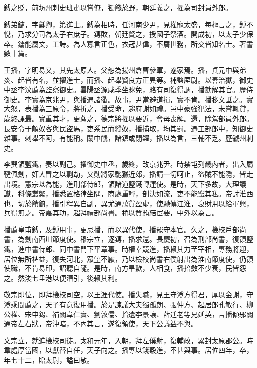 \begin{pinyinscope}
 鎛之貶，前坊州刺史班肅以嘗僚，獨餞於野，朝廷義之，擢為司封員外郎。



 鎛弟鏞，字龢卿，第進士。鎛為相時，任河南少尹，見權寵太盛，每極言之，鎛不悅，乃求分司為太子右庶子。鎛敗，朝廷賢之，授國子祭酒。開成初，以太子少保卒。鏞能屬文，工詩。為人寡言正色，衣冠甚偉，不屑世務，所交皆知名士。著書數十篇。



 王播，字明易又，其先太原人。父恕為揚州倉曹參軍，遂家焉。播，貞元中與弟炎、起皆有名，並擢進士，而播、起舉賢良方正異等。補盩厔尉。以善治獄，御史中丞李汶薦為監察御史。雲陽丞源咸季坐賕免，賂有司復得調，播劾解其官。歷侍御史。李實為京兆尹，與播遇諸衢。故事，尹當避道揖，實不肯。播移文詆之。實大怒，表播為三原令，將折之，播受命，趨府謝如禮。邑中豪強犯法，未嘗輒貸，歲終課最。實重其才，更薦之，德宗將擢以要近，會母喪解。還，除駕部員外郎。長安令于頔奴客與民盜馬，吏系民而縱奴，播捕取，均其罰。遷工部郎中，知御史雜事。刺舉不阿，有能稱。關中饑，諸鎮或閉糴，播以為言，三輔不乏。歷虢州刺史。



 李巽領鹽鐵，奏以副己。擢御史中丞，歲終，改京兆尹。時禁屯列畿內者，出入屬鞬佩劍，奸人冒之以剽劫，又勛將家馳獵近郊，播請一切呵止，盜賊不能隱，皆走出境。憲宗以為能，進刑部侍郎，領諸道鹽鐵轉運使。是時，天下多故，大理議讞，科條叢繁，播悉置格律坐隅，商處重輕，剖決如流，吏不能竄其私。帝討淮西也，切於饋餉，播引程異自副，異尤通萬貨盈虛，使馳傳江淮，裒財用以給軍興，兵得無乏。帝嘉其功，超拜禮部尚書。稍以貲賄結宦要，中外以為言。



 播薦皇甫鎛，及鎛用事，更忌播，而以異代使，播罷守本官。久之，檢校戶部尚書，為劍南西川節度使。穆宗立，逐鎛，播求還。長慶初，召為刑部尚書，復領鹽鐵，進中書侍郎、同中書門下平章事。時權幸競進，播賴其力至宰相，專務將迎，居位無所裨益，復失河北，眾望不厭，乃以檢校尚書右僕射出為淮南節度使，仍領使職，不肯易印，詔聽自隨。是時，南方旱歉，人相食，播掊斂不少衰，民皆怨之。然浚七里港以便漕引，後賴其利。



 敬宗即位，即拜檢校司空，以王涯代使。播失職，見王守澄方得君，厚以金謝，守澄乘間薦之，天子有意復用播。於是諫議大夫獨孤朗、張仲方、起居郎孔敏行、柳公權、宋申錫、補闕韋仁實、劉敦儒、拾遺李景讓、薛廷老等見延英，言播傾邪關通帝左右狀，帝沖暗，不內其言，遂復領使，天下公議益不與。



 文宗立，就進檢校司徒。太和元年，入朝，拜左僕射，復輔政，累封太原郡公。時韋處厚當國，以獻替自任，天子向之。播專以錢穀進，不甚與事。居位四年，卒，年七十二，贈太尉，謚曰敬。




\end{pinyinscope}
